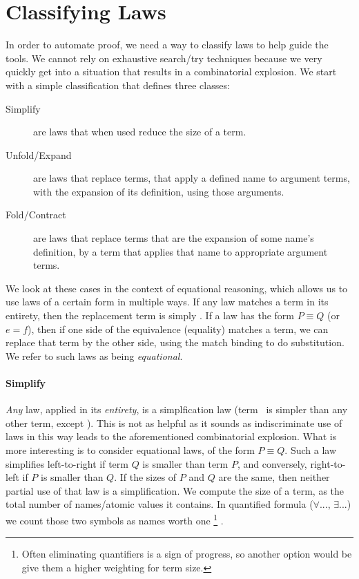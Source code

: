 \chapter{Classifying Laws}

In order to automate proof, 
we need a way to classify laws to help guide the tools.
We cannot rely on exhaustive search/try techniques
because we very quickly get into a situation that results in a 
combinatorial explosion.
We start with a simple classification that defines three classes:

\begin{description}
    \item[Simplify]
      are laws that when used reduce the size of a term.
    \item[Unfold/Expand]
      are laws that replace terms,
      that apply a defined name to argument terms,
      with the expansion of its definition,
      using those arguments.
    \item[Fold/Contract]
      are laws that replace terms
      that are the expansion of some name's definition,
      by a term that applies that name to appropriate argument terms.
\end{description}

We look at these cases in the context of equational reasoning,
which allows us to use laws of a certain form in multiple ways.
If any law matches a term in its entirety, 
then the replacement term is simply \true.
If a law has the form $P \equiv Q$ (or $e = f$),
then if one side of the equivalence (equality) matches a term,
we can replace that term by the other side, 
using the match binding to do substitution.
We refer to such laws as being \emph{equational}.

\subsubsection*{Simplify}

\emph{Any} law, applied in its \emph{entirety}, is a simplfication law
(term \true\ is simpler than any other term, except \false).
This is not as helpful as it sounds as indiscriminate use of laws
in this way leads to the aforementioned combinatorial explosion.
What is more interesting is to consider equational laws,
of the form $P \equiv Q$.
Such a law simplifies left-to-right if term $Q$ is smaller than term $P$,
and conversely, right-to-left if $P$ is smaller than $Q$.
If the sizes of $P$ and $Q$ are the same,
then neither partial use of that law is a simplification.
We compute the size of a term,
as the total number of names/atomic values it contains.
In quantified formula ($\forall ...$, $\exists ...$) 
we count those two symbols as names worth one%
\footnote{
Often eliminating quantifiers is a sign of progress, 
so another option would be give them a higher weighting for term size.
}%
.

